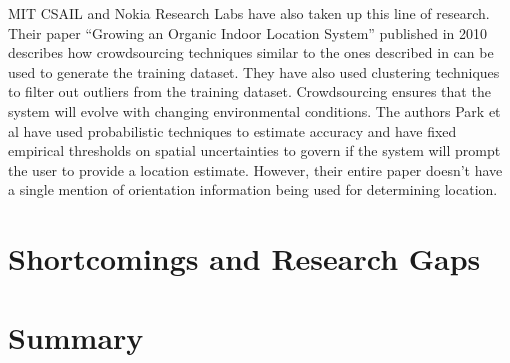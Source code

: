 MIT CSAIL and Nokia Research Labs have also taken up this line of research. Their paper “Growing an Organic Indoor Location System” published in 2010 describes how crowdsourcing techniques similar to the ones described in  can be used to generate the training dataset. They have also used clustering techniques to filter out outliers from the training dataset. Crowdsourcing ensures that the system will evolve with changing environmental conditions. The authors Park et al have used probabilistic techniques to estimate accuracy and have fixed empirical thresholds on spatial uncertainties to govern if the system will prompt the user to provide a location estimate. However, their entire paper doesn’t have a single mention of orientation information being used for determining location. 

\section{Shortcomings and Research Gaps \label{sec:shortcomings} }


\section{Summary \label{sec:litsummary}}

